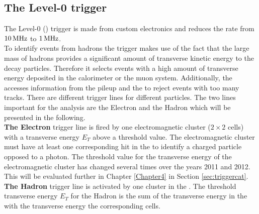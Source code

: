 \subsection{The Level-0 trigger}
\label{sec:l0}
The \lhcb Level-0 (\lone) trigger is made from custom electronics and reduces the rate from $10{\rm \,MHz}$ to $1{\rm \,MHz}$.\\
To identify events from \B hadrons the \lone trigger makes use of the fact that the large mass of \B hadrons provides a significant amount of transverse kinetic energy to the decay particles. Therefore it selects events with a high amount of transverse energy deposited in the calorimeter or the muon system. Additionally, the \lone accesses information from the \velo pileup and the \spd to reject events with too many tracks. There are different \lone trigger lines for different particles. The two lines important for the analysis are the \lone Electron and the \lone Hadron which will be presented in the following.\\
\newpage
\textbf{The \lone Electron} trigger line is fired by one electromagnetic cluster ($2\times 2$ \ecal cells) with a transverse energy $E_T$ above a threshold value. The electromagnetic cluster must have at least one corresponding hit in the \spd to identify a charged particle opposed to a photon. The threshold value for the transverse energy of the electromagnetic cluster has changed several times over the years 2011 and 2012. This will be evaluated further in Chapter \ref{Chapter4} in Section \ref{sec:triggercat}.\\
\textbf{The \lone Hadron} trigger line is activated by one cluster in the \hcal. The threshold transverse energy $E_T$ for the \lone Hadron is the sum of the transverse energy in the \hcal with the transverse energy the corresponding \ecal cells.
\\
